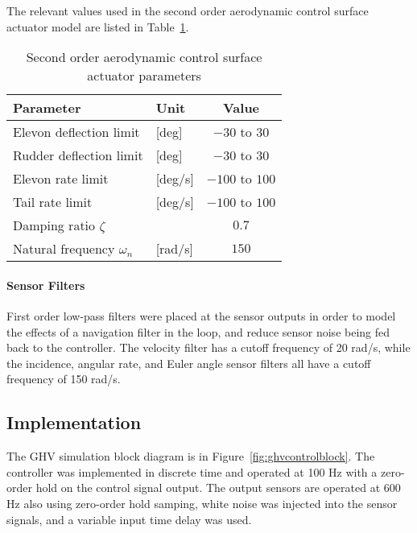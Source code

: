 The relevant values used in the second order aerodynamic control surface actuator model are listed in Table~\ref{tab:actuator}.
\begin{table}[H]
  \centering
  \caption{Second order aerodynamic control surface actuator parameters\label{tab:actuator}}
  \begin{tabular}{llc}
    \toprule
    Parameter & Unit & Value \\
    \midrule
    Elevon deflection limit & [deg] & $-30$ to $30$ \\
    Rudder deflection limit & [deg] & $-30$ to $30$ \\
    Elevon rate limit & [deg/s] & $-100$ to $100$ \\
    Tail rate limit & [deg/s] & $-100 $ to $100$ \\
    Damping ratio $\zeta$ & & $0.7$ \\
    Natural frequency $\omega_{n}$ & [rad/s] & $150$ \\
    \bottomrule
  \end{tabular}
\end{table}

\paragraph{Sensor Filters} First order low-pass filters were placed at the sensor outputs in order to model the effects of a navigation filter in the loop, and reduce sensor noise being fed back to the controller.
The velocity filter has a cutoff frequency of 20 rad/s, while the incidence, angular rate, and Euler angle sensor filters all have a cutoff frequency of 150 rad/s.

\subsection{Implementation}

The GHV simulation block diagram is in Figure~\ref{fig:ghvcontrolblock}.
The controller was implemented in discrete time and operated at 100 Hz with a zero-order hold on the control signal output.
The output sensors are operated at 600 Hz also using zero-order hold samping, white noise was injected into the sensor signals, and a variable input time delay was used.

